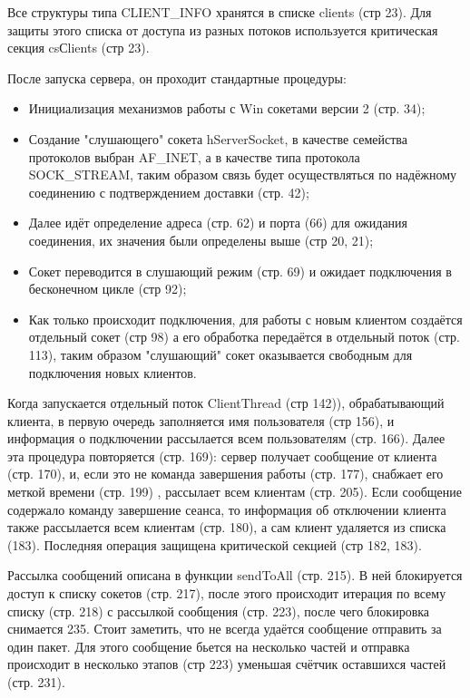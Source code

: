 \documentclass[a4paper, 12pt]{article}		%
\begin{document}
Все структуры типа CLIENT\_INFO хранятся в списке clients (стр 23). Для защиты этого списка от доступа из разных потоков используется критическая секция csСlients (стр 23).

После запуска сервера, он проходит стандартные процедуры:
\begin{itemize}
\item Инициализация механизмов работы с Win сокетами версии 2 (стр. 34);
\item Создание "слушающего" сокета hServerSocket, в качестве семейства протоколов выбран AF\_INET, а в качестве типа протокола SOCK\_STREAM, таким образом связь будет осуществляться по надёжному соединению с подтверждением доставки (стр. 42);
\item Далее идёт определение адреса (стр. 62) и порта (66) для ожидания соединения, их значения были определены выше (стр 20, 21);
\item Сокет переводится в слушающий режим (стр. 69) и ожидает подключения в бесконечном цикле (стр 92);
\item Как только происходит подключения, для работы с новым клиентом создаётся отдельный сокет (стр 98) а его обработка передаётся в отдельный поток (стр. 113), таким образом  "слушающий" сокет оказывается свободным для подключения новых клиентов.
\end{itemize}

Когда запускается отдельный поток ClientThread (стр 142)), обрабатывающий клиента, в первую очередь заполняется имя пользователя (стр 156), и информация о подключении рассылается всем пользователям (стр. 166). Далее эта процедура повторяется (стр. 169): сервер получает сообщение от клиента (стр. 170), и, если это не команда завершения работы (стр. 177), снабжает его меткой времени (стр. 199) , рассылает всем клиентам (стр. 205). Если сообщение содержало команду завершение сеанса, то информация об отключении клиента также рассылается всем клиентам (стр. 180), а сам клиент удаляется из списка (183). Последняя операция защищена критической секцией (стр 182, 183).

Рассылка сообщений описана в функции sendToAll (стр. 215). В ней блокируется доступ к списку сокетов (стр.  217), после этого происходит итерация по всему списку (стр. 218) с рассылкой сообщения (стр. 223), после чего блокировка снимается 235. Стоит заметить, что не всегда удаётся сообщение отправить за один пакет. Для этого сообщение бьется на несколько частей и отправка происходит в несколько этапов (стр 223) уменьшая счётчик оставшихся частей (стр. 231).
\end{document}
